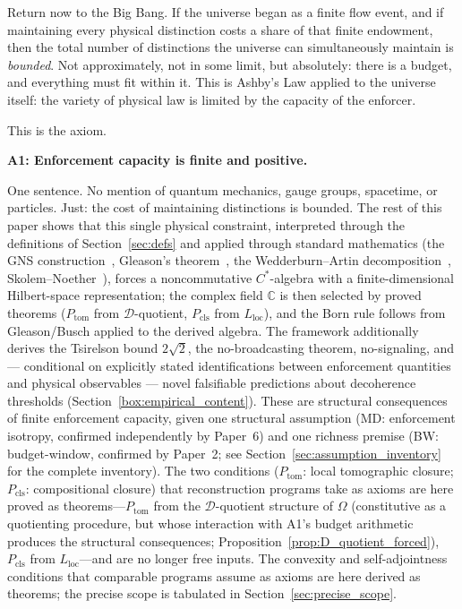 \documentclass[11pt]{article}
\theoremstyle{remark}
\begin{document}
Return now to the Big Bang.  If the universe began as a finite flow event, and if maintaining every physical distinction costs a share of that finite endowment, then the total number of distinctions the universe can simultaneously maintain is \emph{bounded}.  Not approximately, not in some limit, but absolutely: there is a budget, and everything must fit within it.  This is Ashby's Law applied to the universe itself: the variety of physical law is limited by the capacity of the enforcer.

This is the axiom.

\begin{center}
\textbf{A1: Enforcement capacity is finite and positive.}
\end{center}

\noindent One sentence.  No mention of quantum mechanics, gauge groups, spacetime, or particles.  Just: the cost of maintaining distinctions is bounded.  The rest of this paper shows that this single physical constraint, interpreted through the definitions of Section~\ref{sec:defs} and applied through standard mathematics (the GNS construction~\cite{GNS1943}, Gleason's theorem~\cite{Gleason1957}, the Wedderburn--Artin decomposition~\cite{Wedderburn1908,Artin1927}, Skolem--Noether~\cite{Skolem1927,Noether1933}), forces a noncommutative $C^*$-algebra with a finite-dimensional Hilbert-space representation; the complex field $\mathbb{C}$ is then selected by proved theorems ($P_{\mathrm{tom}}$ from $\mathcal{D}$-quotient, $P_{\mathrm{cls}}$ from $L_{\mathrm{loc}}$), and the Born rule follows from Gleason/Busch applied to the derived algebra.  The framework additionally derives the Tsirelson bound $2\sqrt{2}$, the no-broadcasting theorem, no-signaling, and --- conditional on explicitly stated identifications between enforcement quantities and physical observables --- novel falsifiable predictions about decoherence thresholds (Section~\ref{box:empirical_content}).  These are structural consequences of finite enforcement capacity, given one structural assumption (MD: enforcement isotropy, confirmed independently by Paper~6) and one richness premise (BW: budget-window, confirmed by Paper~2; see Section~\ref{sec:assumption_inventory} for the complete inventory).  The two conditions ($P_{\mathrm{tom}}$: local tomographic closure; $P_{\mathrm{cls}}$: compositional closure) that reconstruction programs take as axioms are here proved as theorems---$P_{\mathrm{tom}}$ from the $\mathcal{D}$-quotient structure of $\Omega$ (constitutive as a quotienting procedure, but whose interaction with A1's budget arithmetic produces the structural consequences; Proposition~\ref{prop:D_quotient_forced}), $P_{\mathrm{cls}}$ from $L_{\mathrm{loc}}$---and are no longer free inputs.  The convexity and self-adjointness conditions that comparable programs assume as axioms are here derived as theorems; the precise scope is tabulated in Section~\ref{sec:precise_scope}.
\end{document}
